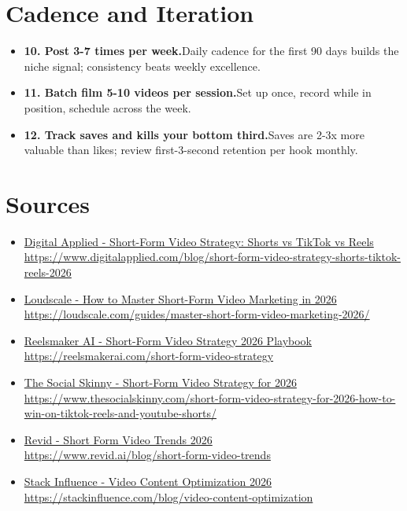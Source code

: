\documentclass[11pt]{article}
\newcommand{\tip}[2]{\item \textbf{#1.}\enspace #2}
\newcommand{\tlabel}{\textcolor{accent}{\small$\blacktriangleright$}}
\begin{document}
\section*{Cadence and Iteration}
\begin{itemize}[label=\tlabel]
\tip{10. Post 3-7 times per week}{Daily cadence for the first 90 days builds the niche signal; consistency beats weekly excellence.}
\tip{11. Batch film 5-10 videos per session}{Set up once, record while in position, schedule across the week.}
\tip{12. Track saves and kills your bottom third}{Saves are 2-3x more valuable than likes; review first-3-second retention per hook monthly.}
\end{itemize}
\section*{Sources}
\begin{itemize}[label={},leftmargin=0.9em,itemsep=1pt]
\footnotesize
\item \href{https://www.digitalapplied.com/blog/short-form-video-strategy-shorts-tiktok-reels-2026}{Digital Applied - Short-Form Video Strategy: Shorts vs TikTok vs Reels} \\ {\color{softgray}\url{https://www.digitalapplied.com/blog/short-form-video-strategy-shorts-tiktok-reels-2026}}
\item \href{https://loudscale.com/guides/master-short-form-video-marketing-2026/}{Loudscale - How to Master Short-Form Video Marketing in 2026} \\ {\color{softgray}\url{https://loudscale.com/guides/master-short-form-video-marketing-2026/}}
\item \href{https://reelsmakerai.com/short-form-video-strategy}{Reelsmaker AI - Short-Form Video Strategy 2026 Playbook} \\ {\color{softgray}\url{https://reelsmakerai.com/short-form-video-strategy}}
\item \href{https://www.thesocialskinny.com/short-form-video-strategy-for-2026-how-to-win-on-tiktok-reels-and-youtube-shorts/}{The Social Skinny - Short-Form Video Strategy for 2026} \\ {\color{softgray}\url{https://www.thesocialskinny.com/short-form-video-strategy-for-2026-how-to-win-on-tiktok-reels-and-youtube-shorts/}}
\item \href{https://www.revid.ai/blog/short-form-video-trends}{Revid - Short Form Video Trends 2026} \\ {\color{softgray}\url{https://www.revid.ai/blog/short-form-video-trends}}
\item \href{https://stackinfluence.com/blog/video-content-optimization}{Stack Influence - Video Content Optimization 2026} \\ {\color{softgray}\url{https://stackinfluence.com/blog/video-content-optimization}}
\end{itemize}
\normalsize
\end{document}
